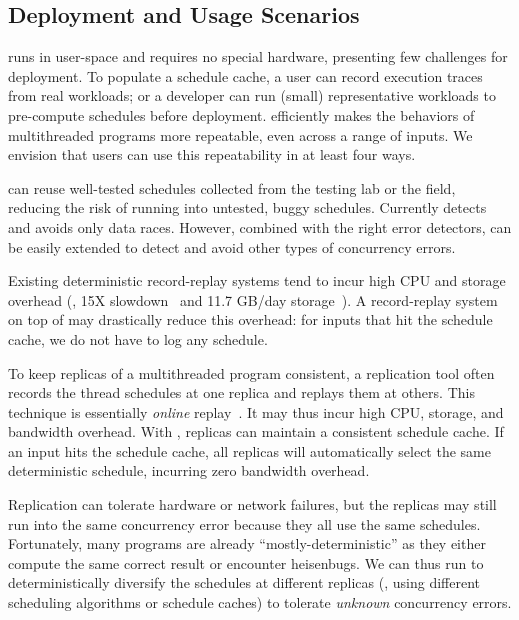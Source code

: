\subsection{Deployment and Usage Scenarios} \label{sec:peregrine-deploy}

\peregrine runs in user-space and requires no special hardware, presenting few
challenges for deployment.  To populate a schedule cache, a user can
record execution traces from real workloads;
or a developer can run (small) representative workloads
to pre-compute schedules before deployment.  \peregrine
efficiently makes the behaviors of multithreaded programs more repeatable,
even across a range of inputs.  We envision that users can use this repeatability in
at least four ways.

 \peregrine can reuse well-tested schedules
collected from the testing lab or the field, reducing the risk of running
into untested, buggy schedules.  
Currently \peregrine detects and avoids only data races.  However, combined with
the right error detectors, \peregrine can be easily extended to detect and
avoid other types of concurrency errors.

 Existing deterministic record-replay systems
tend to incur high CPU and storage overhead (\eg, 15X
slowdown~\cite{idna:vee06} and 11.7 GB/day
storage~\cite{smp-revirt:vee08}).  A record-replay system on top of \peregrine
may drastically reduce this overhead: for inputs that hit the
schedule cache, we do not have to
log any schedule.

To keep replicas of a multithreaded program consistent, a replication tool
often records the thread schedules at one replica and replays them at
others.  This technique is essentially \emph{online}
replay~\cite{respec:asplos10}.
It may thus incur high CPU, storage, and
bandwidth overhead.  With \peregrine, replicas can maintain a consistent
schedule cache.  If an input hits the schedule cache, all replicas will
automatically select the same deterministic schedule, incurring zero
bandwidth overhead.

  Replication can tolerate
hardware or network failures, but the replicas may still run into the same
concurrency error because they all use the same schedules.  Fortunately,
many programs are already ``mostly-deterministic'' as they either compute
the same correct result or encounter heisenbugs.  We can thus run \peregrine to
deterministically diversify the schedules at different replicas (\eg,
using different scheduling algorithms or schedule caches) to tolerate
\emph{unknown} concurrency errors.

